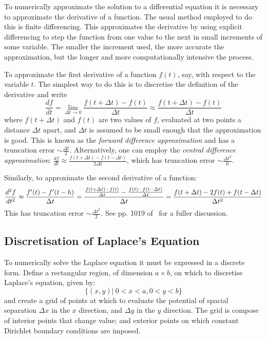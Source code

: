 \documentclass[11pt, a4paper]{article}
\newcommand{\be}{\begin{equation}}
\newcommand{\ee}{\end{equation}}
\begin{document}
To numerically approximate the solution to a differential equation it is
necessary to approximate the derivative of a function. The usual method employed to
do this is finite differencing. This approximates the derivative by using explicit
differencing to step the function from one value to the next in small 
increments of some variable. The smaller the increment used, the more accurate
the approximation, but the longer and more computationally intensive the process.

To approximate the first derivative of a function $f(t)$, say, with respect to the
variable $t$. The simplest way to do this is to discretise the definition of the
derivative and write
%
\be
\frac{df}{dt} = \lim_{\Delta t \to 0} \frac{f(t+\Delta t) - f(t)}{\Delta t} \approx \frac{f(t+\Delta t) - f(t)}{\Delta t}
\ee
%
where $f(t+\Delta t)$ and $f(t)$ are two values of $f$, evaluated at two points
a distance $\Delta t$ apart, and $\Delta t$ is assumed to be small enough that
the approximation is good. This is known as the \emph{forward difference approximation}
and has a truncation error $\sim \frac{\Delta t}{2}$.
Alternatively, one can employ the \emph{central difference approximation}:
$\frac{df}{dt}\approx \frac{f(t+\Delta t) - f(t-\Delta t)}{2 \Delta t}$, which has
truncation error $\sim \frac{\Delta t^2}{6}$.

Similarly, to approximate the second derivative of a function:
%
\be
\frac{d^2 f}{dt^2} \approx \frac{f'(t) - f'(t-h)}{\Delta t} \\
= \frac{\frac{f(t +\Delta t) - f(t)}{\Delta t} - \frac{f(t) - f(t -\Delta t)}{\Delta t}}{\Delta t} \\
= \frac{f(t +\Delta t) - 2f(t) + f(t-\Delta t)}{\Delta t ^2}
\ee
%
This has truncation error $\sim \frac{\Delta t^2}{2}$. See pp. 1019 of~\cite{mm} for a
fuller discussion.

\subsection{Discretisation of Laplace's Equation}

To numerically solve the Laplace equation it must be expressed in a discrete form.
Define a rectangular region, of dimension $a\times b$, on which to discretise
Laplace's equation, given by:
%
\be
\{(x,y)|\:0<x<a, 0<y<b\}
\ee
%
and create a grid of points at which to evaluate the potential of spacial separation
$\Delta x$ in the $x$ direction, and $\Delta y$ in the $y$ direction. The grid is
compose of interior points that change value; and exterior points on which constant
Dirichlet boundary conditions are imposed.
\end{document}
